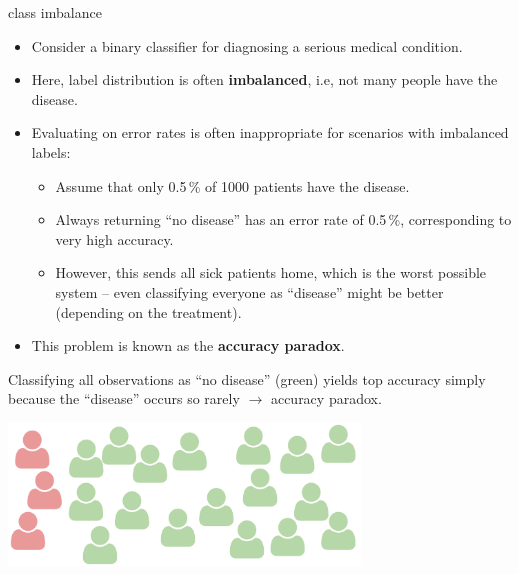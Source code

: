 \documentclass[11pt,compress,t,notes=noshow, xcolor=table]{beamer}
\begin{document}
\begin{vbframe}{class imbalance}

\begin{itemize}
 \item Consider a binary classifier for diagnosing a serious medical 
 condition.
 \item Here, label distribution is often \textbf{imbalanced}, i.e, not many 
 people have the disease.
 \item Evaluating on error rates is often inappropriate for scenarios with 
 imbalanced labels:
 \begin{itemize}
   \item Assume that only 0.5\,\% of 1000 patients have the disease.
   \item Always returning \enquote{no disease} has an error rate of 0.5\,\%, 
   corresponding to very high accuracy.
   \item However, this sends all sick patients home, which is the worst 
   possible system -- even classifying everyone as \enquote{disease} might be 
   better (depending on the treatment).
 \end{itemize}
 \item This problem is known as the \textbf{accuracy paradox}.
\end{itemize}

Classifying all observations as \enquote{no disease} (green) yields top 
accuracy simply because the \enquote{disease} occurs so rarely 
$\rightarrow$ accuracy paradox.

\lz

\begin{center}
  \includegraphics[width=0.7\textwidth]{figure_man/imbalanced.pdf}
\end{center}

\end{vbframe}
 
\end{document}
